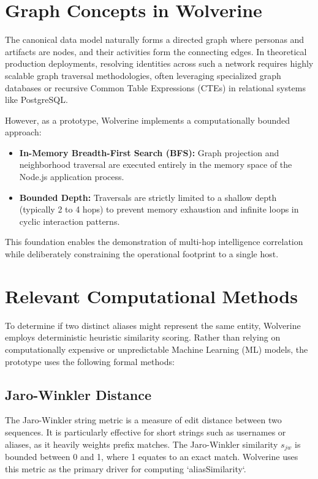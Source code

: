 \section{Graph Concepts in Wolverine}
\label{sec:foundations-graph}
The canonical data model naturally forms a directed graph where personas and artifacts are nodes, and their activities form the connecting edges. 
In theoretical production deployments, resolving identities across such a network requires highly scalable graph traversal methodologies, often leveraging specialized graph databases or recursive Common Table Expressions (CTEs) in relational systems like PostgreSQL.

However, as a prototype, Wolverine implements a computationally bounded approach:
\begin{itemize}
    \item \textbf{In-Memory Breadth-First Search (BFS):} Graph projection and neighborhood traversal are executed entirely in the memory space of the Node.js application process. 
    \item \textbf{Bounded Depth:} Traversals are strictly limited to a shallow depth (typically 2 to 4 hops) to prevent memory exhaustion and infinite loops in cyclic interaction patterns.
\end{itemize}
This foundation enables the demonstration of multi-hop intelligence correlation while deliberately constraining the operational footprint to a single host.

\section{Relevant Computational Methods}
\label{sec:foundations-methods}
To determine if two distinct aliases might represent the same entity, Wolverine employs deterministic heuristic similarity scoring. Rather than relying on computationally expensive or unpredictable Machine Learning (ML) models, the prototype uses the following formal methods:

\subsection{Jaro-Winkler Distance}
The Jaro-Winkler string metric is a measure of edit distance between two sequences. It is particularly effective for short strings such as usernames or aliases, as it heavily weights prefix matches. The Jaro-Winkler similarity $s_{jw}$ is bounded between 0 and 1, where 1 equates to an exact match. Wolverine uses this metric as the primary driver for computing `aliasSimilarity`.

